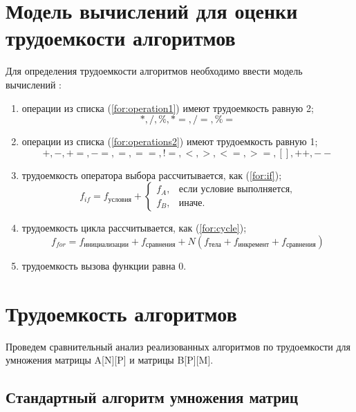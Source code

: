 \section{Модель вычислений для оценки трудоемкости алгоритмов}

Для определения трудоемкости алгоритмов необходимо ввести модель вычислений \cite{model}:

\begin{enumerate}
	\item операции из списка (\ref{for:operation1}) имеют трудоемкость равную 2;
	\begin{equation}
		\label{for:operation1}
		*, /, \%, *=, /=, \%=
	\end{equation}
	\item операции из списка (\ref{for:operations2}) имеют трудоемкость равную 1;
	\begin{equation}
		\label{for:operations2}
		+, -, +=, -=, =, ==, !=, <, >, <=, >=, [], ++, {-}-
	\end{equation}
	\item трудоемкость оператора выбора  рассчитывается, как (\ref{for:if});
	\begin{equation}
		\label{for:if}
		f_{if} = f_{\text{условия}} +
		\begin{cases}
			f_A, & \text{если условие выполняется,}\\
			f_B, & \text{иначе.}
		\end{cases}
	\end{equation}
	\item трудоемкость цикла рассчитывается, как (\ref{for:cycle});
	\begin{equation}
		\label{for:cycle}
		f_{for} = f_{\text{инициализации}} + f_{\text{сравнения}} + N(f_{\text{тела}} + f_{\text{инкремент}} + f_{\text{сравнения}})
	\end{equation}
	\item трудоемкость вызова функции равна 0.
\end{enumerate}

\section{Трудоемкость алгоритмов}

Проведем сравнительный анализ реализованных алгоритмов по трудоемкости для умножения матрицы A[N][P] и матрицы B[P][M].

\subsection{Стандартный алгоритм умножения матриц}

